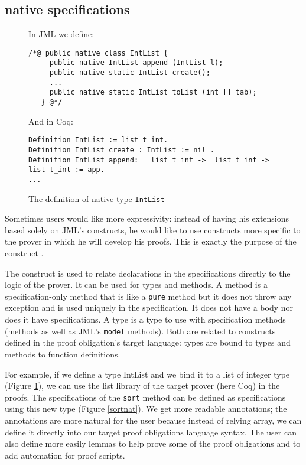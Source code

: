 \subsection{native specifications}
\begin{figure}[t!]
{\small In JML we define:
\begin{verbatim}
/*@ public native class IntList {
     public native IntList append (IntList l);
     public native static IntList create();
     ...
     public native static IntList toList (int [] tab);
   } @*/ \end{verbatim}}

{\small And in Coq:
\begin{verbatim}
Definition IntList := list t_int.
Definition IntList_create : IntList := nil .  
Definition IntList_append:   list t_int ->  list t_int -> list t_int := app.
... \end{verbatim}}
\caption{The definition of native type \texttt{IntList}}\label{CoqAnnot} 
\end{figure}
Sometimes users would like more expressivity: instead of having his
 extensions based solely on JML's constructs, he would like 
to use constructs more specific to the prover in which he will develop his 
proofs. This is 
exactly the purpose of the \native construct \cite{Charles06}.

The \native construct is used to relate declarations in
the specifications directly to the logic of the prover. It can be used 
for types and methods.
A \native method is a specification-only method that is like a {\tt pure} method 
but  it does not throw any exception and is used uniquely in the specification.
It does not have a body nor does it have specifications. 
A \native type is a type to use with specification methods 
(\native methods as well as JML's {\tt model} methods). 
Both are related to constructs 
defined in the proof obligation's target language: 
\native types are bound to 
types and \native methods to function definitions.


For example, if we define a \native type IntList and we bind it to a 
list of integer type (Figure \ref{CoqAnnot}), 
we can use the list library of the target prover (here Coq) 
in the proofs. The specifications of the
{\tt sort} method can be defined as specifications using this new type 
(Figure \ref{sortnat}). We get more readable annotations;
the annotations are more natural for the user because instead
 of relying array, we can define it directly into
our target proof obligations language syntax.
The user can also define more easily lemmas to help prove some of the proof
obligations and to add automation for proof scripts.


